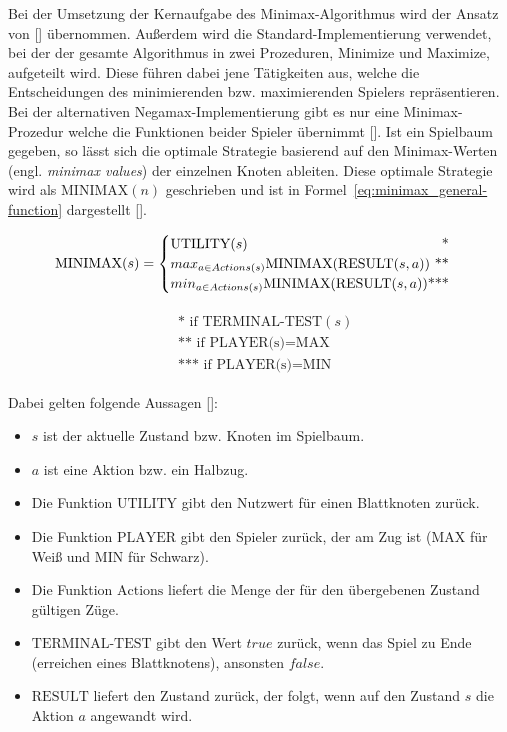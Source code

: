 Bei der Umsetzung der Kernaufgabe des Minimax-Algorithmus wird der Ansatz von [\cite{Knuth1975}] übernommen.
Außerdem wird die Standard-Implementierung verwendet, bei der der gesamte Algorithmus in zwei Prozeduren, Minimize und  Maximize, aufgeteilt wird.
Diese führen dabei jene Tätigkeiten aus, welche die Entscheidungen des minimierenden bzw. maximierenden Spielers repräsentieren.
Bei der alternativen Negamax-Implementierung gibt es nur eine Minimax-Prozedur welche die Funktionen beider Spieler übernimmt [\cite{Wikipedia2020}].
Ist ein Spielbaum gegeben, so lässt sich die optimale Strategie basierend auf den Minimax-Werten (engl. \textit{minimax values}) der einzelnen Knoten ableiten.
Diese optimale Strategie wird als $\text{MINIMAX}(n)$ geschrieben und ist in Formel~\ref{eq:minimax_general-function} dargestellt [\cite{Russell2010}].

\begin{equation} \label{eq:minimax_general-function}
    \text{MINIMAX}(s) =
    \begin{cases}
        \text{UTILITY}(s) \hfill \text{*} \\
        max_{a \in Actions(s)} \text{MINIMAX}(\text{RESULT}(s, a)) \hfill \text{**} \\
        min_{a \in Actions(s)} \text{MINIMAX}(\text{RESULT}(s, a)) \hfill \text{***} \\
    \end{cases}
\end{equation}

\begin{align*}
    \begin{split}
        & \text{*\ \ \ \ if TERMINAL-TEST}(s) \\
        & \text{**\ \ \ if PLAYER(s)} = \text{MAX} \\
        & \text{***\ \ if PLAYER(s)} = \text{MIN}
    \end{split}
\end{align*}

Dabei gelten folgende Aussagen [\cite{Russell2010}]:

\begin{itemize}
    \item $s$ ist der aktuelle Zustand bzw. Knoten im Spielbaum.
    \item $a$ ist eine Aktion bzw. ein Halbzug.
    \item Die Funktion $\text{UTILITY}$ gibt den Nutzwert für einen Blattknoten zurück.
    \item Die Funktion $\text{PLAYER}$ gibt den Spieler zurück, der am Zug ist ($\text{MAX}$ für Weiß und $\text{MIN}$ für Schwarz).
    \item Die Funktion $\text{Actions}$ liefert die Menge der für den übergebenen Zustand gültigen Züge.
    \item $\text{TERMINAL-TEST}$ gibt den Wert $true$ zurück, wenn das Spiel zu Ende (erreichen eines Blattknotens), ansonsten $false$.
    \item $\text{RESULT}$ liefert den Zustand zurück, der folgt, wenn auf den Zustand $s$ die Aktion $a$ angewandt wird.
\end{itemize}

